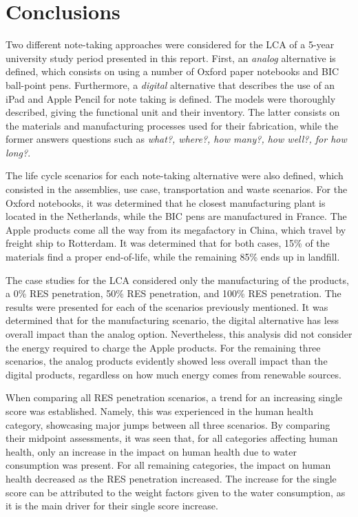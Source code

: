 \section{Conclusions}\label{sec:conclusions}

Two different note-taking approaches were considered for the LCA of a 5-year university study period presented in this report. First, an \textit{analog} alternative is defined, which consists on using a number of Oxford paper notebooks and BIC ball-point pens. Furthermore, a \textit{digital} alternative that describes the use of an iPad and Apple Pencil for note taking is defined. The models were thoroughly described, giving the functional unit and their inventory. The latter consists on the materials and manufacturing processes used for their fabrication, while the former answers questions such as \textit{what?, where?, how many?, how well?, for how long?}. 

The life cycle scenarios for each note-taking alternative were also defined, which consisted in the assemblies, use case, transportation and waste scenarios. For the Oxford notebooks, it was determined that he closest manufacturing plant is located in the Netherlands, while the BIC pens are manufactured in France. The Apple products come all the way from its megafactory in China, which travel by freight ship to Rotterdam. It was determined that for both cases, 15\% of the materials find a proper end-of-life, while the remaining 85\% ends up in landfill. 

The case studies for the LCA considered only the manufacturing of the products, a 0\% RES penetration, 50\% RES penetration, and 100\% RES penetration. The results were presented for each of the scenarios previously mentioned. It was determined that for the manufacturing scenario, the digital alternative has less overall impact than the analog option. Nevertheless, this analysis did not consider the energy required to charge the Apple products. For the remaining three scenarios, the analog products evidently showed less overall impact than the digital products, regardless on how much energy comes from renewable sources. 

When comparing all RES penetration scenarios, a trend for an increasing single score was established. Namely, this was experienced in the human health category, showcasing major jumps between all three scenarios. By comparing their midpoint assessments, it was seen that, for all categories affecting human health, only an increase in the impact on human health due to water consumption was present. For all remaining categories, the impact on human health decreased as the RES penetration increased. The increase for the single score can be attributed to the weight factors given to the water consumption, as it is the main driver for their single score increase.